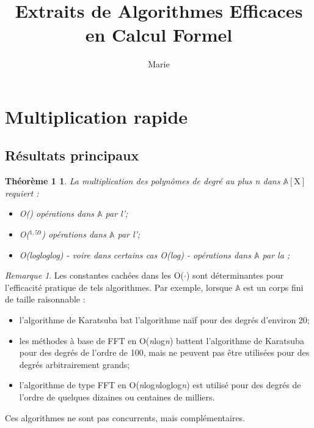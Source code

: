 \documentclass[a4paper]{article}
\title{Extraits de Algorithmes Efficaces en Calcul Formel}
\author{Marie}
\begin{document}
\maketitle

\section{Multiplication rapide}
\subsection{Résultats principaux}

\newtheorem*{thm}{Théorème 1}
\begin{thm}
    La multiplication des polynômes de degré au plus \textit{n} dans $\mathbb{A}[\mathrm{X}]$ requiert :
    \begin{itemize}
        \item O() opérations dans $\mathbb{A}$ par l';
        \item O($^{1,59}$) opérations dans $\mathbb{A}$ par l';
        \item O(logloglog) - voire dans certains cas O(log) - opérations dans $\mathbb{A}$ par la ;
    \end{itemize}
\end{thm}

\theoremstyle{remark}
\newtheorem*{rem}{Remarque}
\begin{rem}
Les constantes cachées dans les O($\cdot$) sont déterminantes pour l'efficacité pratique de tels algorithmes. Par exemple, lorsque $\mathbb{A}$ est un corps fini de taille \og raisonnable \fg :
\begin{itemize}
    \item l'algorithme de Karatsuba bat l'algorithme naïf pour des degrés d'environ 20;
    \item les méthodes à base de FFT en O(\textit{n}log\textit{n}) battent l'algorithme de Karatsuba pour des degrés 
    de l'ordre de 100, mais ne peuvent pas être utilisées pour des degrés arbitrairement grands;
    \item l'algorithme de type FFT en O(\textit{n}log\textit{n}loglog\textit{n}) est utilisé pour des degrés de l'ordre de quelques dizaines ou centaines de milliers.
\end{itemize}
Ces algorithmes ne sont pas concurrents, mais complémentaires.
\end{rem}
\medskip
\end{document}
